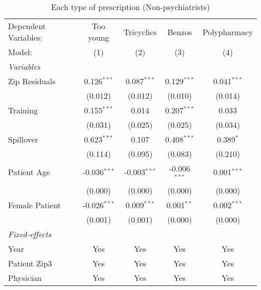 
\begin{table}[htbp]
   \centering
   \begin{threeparttable}[b]
      \caption{Each type of prescription (Non-psychiatrists)}
      \begin{tabular}{lcccc}
         \tabularnewline \midrule \midrule
         Dependent Variables:    & Too young      & Tricyclics     & Benzos         & Polypharmacy\\  
         Model:                  & (1)            & (2)            & (3)            & (4)\\  
         \midrule
         \emph{Variables}\\
         Zip Residuals           & 0.126$^{***}$  & 0.087$^{***}$  & 0.129$^{***}$  & 0.041$^{***}$\\   
                                 & (0.012)        & (0.012)        & (0.010)        & (0.014)\\   
         Training                & 0.155$^{***}$  & 0.014          & 0.207$^{***}$  & 0.033\\   
                                 & (0.031)        & (0.025)        & (0.025)        & (0.034)\\   
         Spillover               & 0.623$^{***}$  & 0.107          & 0.408$^{***}$  & 0.389$^{*}$\\   
                                 & (0.114)        & (0.095)        & (0.083)        & (0.210)\\   
         Patient Age             & -0.036$^{***}$ & -0.003$^{***}$ & -0.006$^{***}$ & 0.001$^{***}$\\   
                                 & (0.000)        & (0.000)        & (0.000)        & (0.000)\\   
         Female Patient          & -0.026$^{***}$ & 0.009$^{***}$  & 0.001$^{**}$   & 0.002$^{***}$\\   
                                 & (0.001)        & (0.001)        & (0.000)        & (0.000)\\   
         \midrule
         \emph{Fixed-effects}\\
         Year                    & Yes            & Yes            & Yes            & Yes\\  
         Patient Zip3            & Yes            & Yes            & Yes            & Yes\\  
         Physician               & Yes            & Yes            & Yes            & Yes\\  
         \midrule

\end{tabular}
\end{threeparttable}
\end{table}
